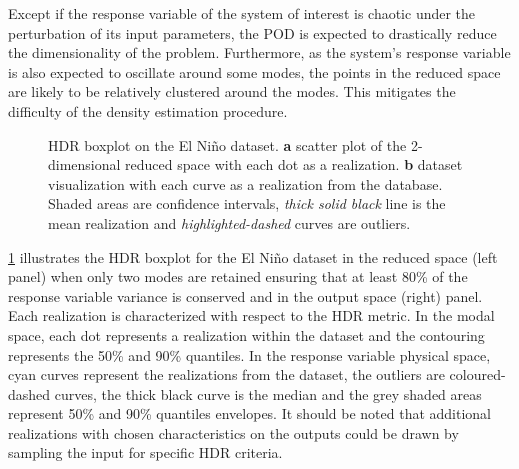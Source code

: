 Except if the response variable of the system of interest is chaotic under the perturbation of its input parameters, the POD is expected to drastically reduce the dimensionality of the problem. Furthermore, as the system's response variable is also expected to oscillate around some modes, the points in the reduced space are likely to be relatively clustered around the modes. This mitigates the difficulty of the density estimation procedure.

\begin{figure}[!ht]               
\centering
{}
\caption{HDR boxplot on the El Ni\~no dataset. \textbf{a} scatter plot of the 2-dimensional reduced space with each dot as a realization. \textbf{b} dataset visualization with each curve as a realization from the database. Shaded areas are confidence intervals, \emph{thick solid black} line is the mean realization and \emph{highlighted-dashed} curves are outliers.}
\label{fig:elnino}
\end{figure}

\cref{fig:elnino} illustrates the HDR boxplot for the El Ni\~no dataset in the reduced space (left panel) when only two modes are retained ensuring that at least 80\% of the response variable variance is conserved and in the output space (right) panel. Each realization is characterized with respect to the HDR metric. In the modal space, each dot represents a realization within the dataset and the contouring represents the 50\% and 90\% quantiles. In the response variable physical space, cyan curves represent the realizations from the dataset, the outliers are coloured-dashed curves, the thick black curve is the median and the grey shaded areas represent 50\% and 90\% quantiles envelopes. It should be noted that additional realizations with chosen characteristics on the outputs could be drawn by sampling the input for specific HDR criteria.


